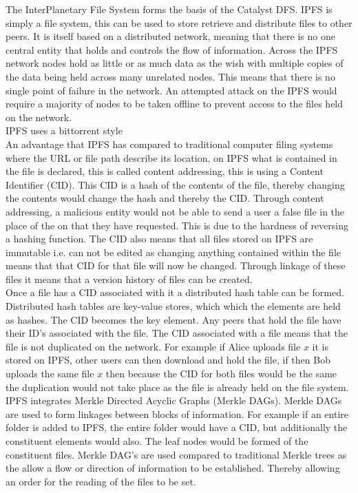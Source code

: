 The InterPlanetary File System forms the basis of the Catalyst DFS. IPFS is simply a file system, this can be used to store retrieve and distribute files to other peers. It is itself based on a distributed network, meaning that there is no one central entity that holds and controls the flow of information. Across the IPFS network nodes hold as little or as much data as the wish with multiple copies of the data being held across many unrelated nodes. This means that there is no single point of failure in the network. An attempted attack on the IPFS would require a majority of nodes to be taken offline to prevent access to the files held on the network.   \\

IPFS uses a bittorrent style \\

An advantage that IPFS has compared to traditional computer filing systems where the URL or file path describe its location, on IPFS what is contained in the file is declared, this is called content addressing, this is using a Content Identifier (CID). This CID is a hash of the contents of the file, thereby changing the contents would change the hash and thereby the CID. Through content addressing, a malicious entity would not be able to send a user a false file in the place of the on that they have requested. This is due to the hardness of reversing a hashing function. The CID also means that all files stored on IPFS are immutable i.e. can not be edited as changing anything contained within the file means that that CID for that file will now be changed. Through linkage of these files it means that a version history of files can be created. \\

Once a file has a CID associated with it a distributed hash table can be formed. Distributed hash tables are key-value stores, which which the elements are held as hashes. The CID becomes the key element. Any peers that hold the file have their ID's associated with the file. The CID associated with a file means that the file is not duplicated on the network. For example if Alice uploads file $x$ it is stored on IPFS, other users can then download and hold the file, if then Bob uploads the same file $x$ then because the CID for both files would be the same the duplication would not take place as the file is already held on the file system.  \\

IPFS integrates Merkle Directed Acyclic Graphs (Merkle DAGs). Merkle DAGs are used to form linkages between blocks of information. For example if an entire folder is added to IPFS, the entire folder would have a CID, but additionally the constituent elements would also. The leaf nodes would be formed of the constituent files. Merkle DAG's are used compared to traditional Merkle trees as the allow a flow or direction of information to be established. Thereby allowing an order for the reading of the files to be set. 
